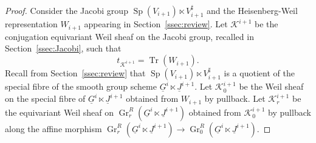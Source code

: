 \documentclass[10pt]{amsart}
\theoremstyle{plain}
\theoremstyle{definition}
\DeclareMathOperator{\Gr}{Gr}
\DeclareMathOperator{\trace}{Tr}
\newcommand{\trFrob}[1]{t_{#1}}
\newcommand{\cs}[1]{{\mathcal{#1}}}
\newcommand{\Sp}{{\operatorname{Sp}}}
\begin{document}
\begin{proof}
Consider the Jacobi group $\Sp(V_{i+1})\ltimes V_{i+1}^\sharp$ and the Heisenberg-Weil representation $W_{i+1}$ appearing in Section~\ref{ssec:review}.
Let $\cs{K}^{i+1}$ be the conjugation equivariant Weil sheaf on the Jacobi group, recalled in Section~\ref{ssec:Jacobi}, such that
\[
\trFrob{\cs{K}^{i+1}} = \trace(W_{i+1}).
\]
Recall from Section~\ref{ssec:review} that $\Sp(V_{i+1})\ltimes V_{i+1}^\sharp$ is a quotient of the special fibre of the smooth group scheme $\underline{G}^{i} \ltimes \underline{J}^{i+1}$.
Let $\cs{K}_0^{i+1}$ be the Weil sheaf on the special fibre of $\underline{G}^{i} \ltimes \underline{J}^{i+1}$ obtained from $W_{i+1}$ by pullback. 
Let $\cs{K}_r^{i+1}$ be the equivariant Weil sheaf on $\Gr^{R}_r(\underline{G}^{i} \ltimes \underline{J}^{i+1})$ obtained from $\cs{K}_0^{i+1}$ by pullback along the affine morphism
$\Gr^{R}_r(\underline{G}^{i} \ltimes \underline{J}^{i+1}) \to \Gr^{R}_0(\underline{G}^{i} \ltimes \underline{J}^{i+1})$.


\end{proof}
\end{document}
